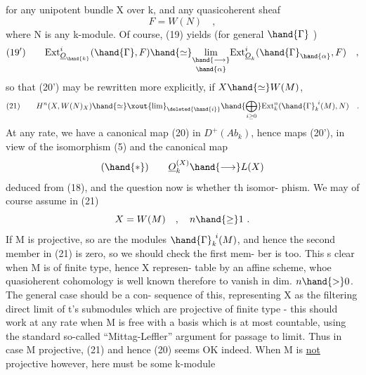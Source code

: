 
for any unipotent bundle X over k,  and any quasicoherent sheaf
\[ F = W(N) \quad , \]
where N is any k-module.  Of course, (19)  yields (for general $\hand{\Gamma}$ )
\[ (19') \qquad \mathrm{Ext}^{i}_{\underline{O}_{\hand{k}}}( \hand{\Gamma} , F) \hand{\simeq} \underset{\hand{\alpha}}{\underset{\hand{\longrightarrow}}{\mathrm{lim}}} \mathrm{Ext}^{i}_{\underline{O}_k}( \hand{\Gamma}_{\hand{\alpha}} , F) \quad , \]
so that (20')  may be rewritten more explicitly,  if  $X \hand{\simeq} W(M)$, 
\[ (21) \qquad H^{n}(X,W(N)_X) \hand{\simeq} \xout{\mathrm{lim}}_{\deleted{\hand{i}}} \hand{\bigoplus_{i\geq 0}} \mathrm{Ext}^{n}_{k}(\hand{\Gamma}_k^{\ i}(M),N) \quad . \]
At any rate,  we have a canonical map (20) in $D^{+}(Ab_k)$,  hence maps
(20'),  in view of the isomorphism (5)  and the canonical map
\[ (\hand{*}) \qquad \underline{O}_k^{(X)} \hand{\longrightarrow} L(X) \]
deduced from (18),  and the question now is whether th  isomor-%
phism.  We may of course assume  in (21)
\[ X = W(M) \quad , \quad n \hand{\geq} 1 \ . \]
If M is projective,  so are the modules $\hand{\Gamma}_k^{\ i}(M)$,  and hence 
the second  member in (21) is zero,  so we should check the first mem-%
ber is too.  This s clear when M is of finite type,  hence X represen-%
table by an affine scheme,  whoe quasioherent cohomology is well known
therefore to vanish in dim. $n \hand{>} 0$.  The  general case should be a con-%
sequence of this,  representing X as the filtering direct limit of
t's submodules which are projective of finite type  -  this should work
at any rate when M is free with a basis which is at most countable,
using the standard so-called ``Mittag-Leffler'' argument for passage to
limit.   Thus in case M projective,  (21)  and hence (20) seems OK
indeed.  When M is \uline{not} projective however,  here must be some k-module

